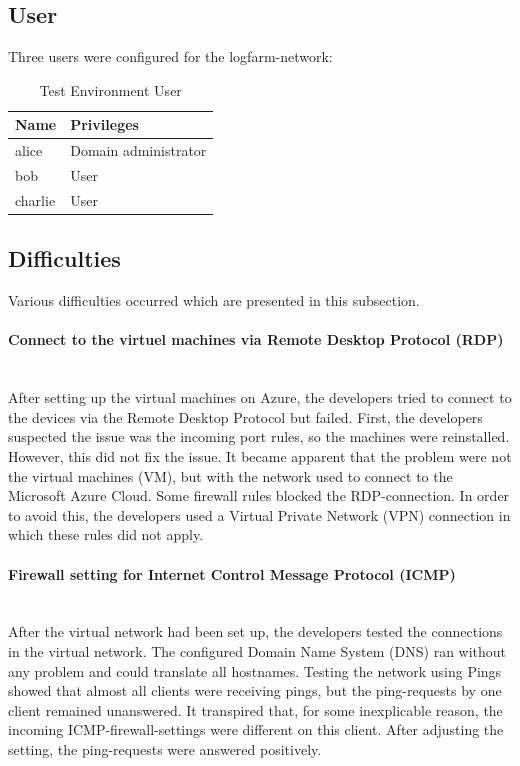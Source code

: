 \clearpage

\subsection{User}
Three users were configured for the logfarm-network:
\begin{table}[H]
    \centering
    \begin{tabular}{p{4cm} p{8cm}} \hline
        \textbf{Name} & \textbf{Privileges}  \\ \hline
        alice & Domain administrator  \\ \hline
        bob & User  \\ \hline
        charlie & User  \\ \hline
    \end{tabular}
    \caption{Test Environment User}
\end{table}

\subsection{Difficulties}
Various difficulties occurred which are presented in this subsection.
\paragraph{Connect to the virtuel machines via Remote Desktop Protocol (RDP)} \ \\
After setting up the virtual machines on Azure, the developers tried to connect to the devices via the Remote Desktop Protocol but failed. First, the developers suspected the issue was the incoming port rules, so the machines were reinstalled. However, this did not fix the issue. It became apparent that the problem were not the virtual machines (VM), but with the network used to connect to the Microsoft Azure Cloud. Some firewall rules blocked the RDP-connection. In order to avoid this, the developers used a Virtual Private Network (VPN) connection in which these rules did not apply.
\paragraph{Firewall setting for Internet Control Message Protocol (ICMP)}\ \\
After the virtual network had been set up, the developers tested the connections in the virtual network. The configured Domain Name System (DNS) ran without any problem and could translate all hostnames. Testing the network using Pings showed that almost all clients were receiving pings, but the ping-requests by one client remained unanswered. It transpired that, for some inexplicable reason, the incoming ICMP-firewall-settings were different on this client. After adjusting the setting, the ping-requests were answered positively.

